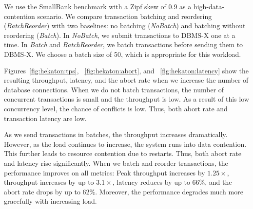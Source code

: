 
We use the SmallBank benchmark with a Zipf skew of 0.9 as a high-data-contention scenario. We compare transaction batching and reordering (\emph{BatchReorder}) with two baselines: no batching (\emph{NoBatch}) and batching without reordering (\emph{Batch}). In \emph{NoBatch}, we submit transactions to DBMS-X one at a time. In \emph{Batch} and \emph{BatchReorder}, we batch transactions before sending them to DBMS-X. We choose a batch size of 50, which is appropriate for this workload.

Figures~\ref{fig:hekaton:tps}, ~\ref{fig:hekaton:abort}, and ~\ref{fig:hekaton:latency} show the resulting throughput, latency, and the abort rate when we increase the number of database connections.  When we do not batch transactions, the number of concurrent transactions is small and the throughput is low. As a result of this low concurrency level, the chance of conflicts is low. Thus, both abort rate and transaction latency are low. 

As we send transactions in batches, the throughput increases dramatically. 
However, as the load continues to increase, the system runs into data contention. This further leads to resource contention due to restarts. Thus, both abort rate and latency rise significantly. When we batch and reorder transactions, the performance improves on all metrics: Peak throughput increases by $1.25\times$, throughput increases by up to $3.1\times$, latency reduces by up to $66\%$, and the abort rate drops by up to $62\%$.  Moreover, the performance degrades much more gracefully with increasing load.
